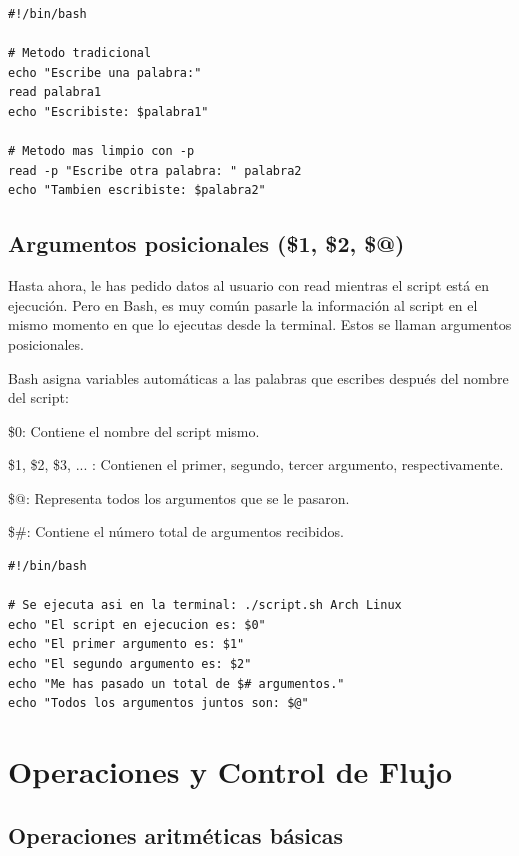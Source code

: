 \begin{ejemplo}
\begin{lstlisting}
#!/bin/bash

# Metodo tradicional
echo "Escribe una palabra:"
read palabra1
echo "Escribiste: $palabra1"

# Metodo mas limpio con -p
read -p "Escribe otra palabra: " palabra2
echo "Tambien escribiste: $palabra2"
\end{lstlisting}
\end{ejemplo}

\newpage

\subsection{Argumentos posicionales (\$1, \$2, \$@)}

Hasta ahora, le has pedido datos al usuario con read mientras el script está en ejecución. Pero en Bash, es muy común pasarle la información al script en el mismo momento en que lo ejecutas desde la terminal. Estos se llaman argumentos posicionales.

Bash asigna variables automáticas a las palabras que escribes después del nombre del script:

\$0: Contiene el nombre del script mismo.

\$1, \$2, \$3, ... : Contienen el primer, segundo, tercer argumento, respectivamente.

\$@: Representa todos los argumentos que se le pasaron.

\$\#: Contiene el número total de argumentos recibidos.

\begin{ejemplo}
\begin{lstlisting}
#!/bin/bash

# Se ejecuta asi en la terminal: ./script.sh Arch Linux
echo "El script en ejecucion es: $0"
echo "El primer argumento es: $1"
echo "El segundo argumento es: $2"
echo "Me has pasado un total de $# argumentos."
echo "Todos los argumentos juntos son: $@"
\end{lstlisting}
\end{ejemplo}

\newpage

\section{Operaciones y Control de Flujo}

\subsection{Operaciones aritméticas básicas}

